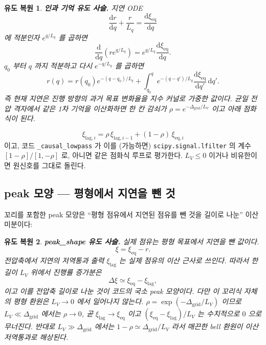 \documentclass[11pt,a4paper]{article}
\newtheorem*{derivebox}{유도 복원}
\newcommand{\dd}{\mathrm{d}}
\newcommand{\eq}{\mathrm{eq}}
\newcommand{\code}[1]{\texttt{#1}}
\begin{document}
\begin{derivebox}
\textbf{인과 기억 유도 사슬.} 지연 ODE
\begin{equation*}
\frac{\dd r}{\dd q}+\frac{r}{L_q}=\frac{\dd\xi_{\eq}}{\dd q}
\end{equation*}
에 적분인자 $e^{q/L_q}$ 를 곱하면
\begin{equation*}
\frac{\dd}{\dd q}\left(r e^{q/L_q}\right)=e^{q/L_q}\frac{\dd\xi_{\eq}}{\dd q}.
\end{equation*}
$q_0$ 부터 $q$ 까지 적분하고 다시 $e^{-q/L_q}$ 를 곱하면
\begin{equation*}
r(q)=r(q_0)e^{-(q-q_0)/L_q}+\int_{q_0}^{q}e^{-(q-q')/L_q}\frac{\dd\xi_{\eq}}{\dd q'}\,\dd q'.
\end{equation*}
즉 현재 지연은 진행 방향의 과거 목표 변화율을 지수 커널로 가중한 값이다. 균일 전압 격자에서 같은 1차 기억을 이산화하면 한 칸 감쇠가 $\rho=e^{-\Delta_{\mathrm{grid}}/L_V}$ 이고 아래 점화식이 된다.
\end{derivebox}

\begin{equation}
\xi_{\mathrm{lag},i}=\rho\,\xi_{\mathrm{lag},i-1}+(1-\rho)\,\xi_{\eq,i}
\label{eq:lowpass}
\end{equation}
이고, 코드 \code{\_causal\_lowpass} 가 이를 (가능하면) \code{scipy.signal.lfilter} 의 계수
$[1-\rho]/[1,-\rho]$ 로, 아니면 같은 점화식 루프로 평가한다. $L_V\le0$ 이거나 비유한이면 원신호를 그대로 돌린다.

\subsection{peak 모양 — 평형에서 지연을 뺀 것}
꼬리를 포함한 peak 모양은 ``평형 점유에서 지연된 점유를 뺀 것을 길이로 나눈'' 이산 미분이다:

\begin{derivebox}
\textbf{peak\_shape 유도 사슬.} 실제 점유는 평형 목표에서 지연을 뺀 값이다.
\begin{equation*}
\xi=\xi_{\eq}-r.
\end{equation*}
전압축에서 지연의 저역통과 출력 $\xi_{\mathrm{lag}}$ 는 실제 점유의 이산 근사로 쓰인다. 따라서 한 길이 $L_V$ 위에서 진행률 증가분은
\begin{equation*}
\Delta\xi\simeq\xi_{\eq}-\xi_{\mathrm{lag}},
\end{equation*}
이고 이를 전압축 길이로 나눈 것이 코드의 국소 peak 모양이다. 다만 이 꼬리식 자체의 평형 환원은 $L_V\to0$ 에서 일어나지 않는다.
$\rho=\exp(-\Delta_{\mathrm{grid}}/L_V)$ 이므로 $L_V\ll\Delta_{\mathrm{grid}}$ 에서는 $\rho\to0$, 곧
$\xi_{\mathrm{lag}}\to\xi_{\eq}$ 이고 $(\xi_\eq-\xi_{\mathrm{lag}})/L_V$ 는 수치적으로 $0$ 으로 무너진다. 반대로
$L_V\gg\Delta_{\mathrm{grid}}$ 에서는 $1-\rho\simeq\Delta_{\mathrm{grid}}/L_V$ 라서 매끈한 bell 환원이 이산 저역통과로 해상된다.
\end{derivebox}
\end{document}
